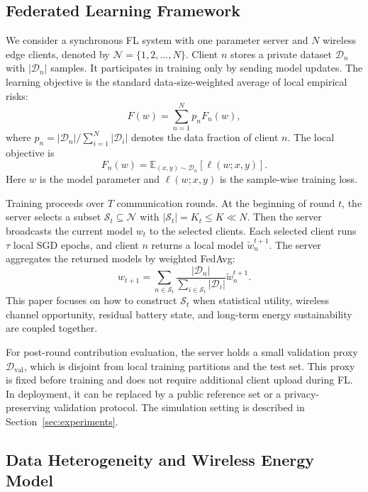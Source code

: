 \documentclass[journal]{IEEEtran}
\begin{document}
\subsection{Federated Learning Framework}

We consider a synchronous FL system with one parameter server and $N$ wireless edge clients, denoted by $\mathcal{N}=\{1,2,\ldots,N\}$. Client $n$ stores a private dataset $\mathcal{D}_n$ with $|\mathcal{D}_n|$ samples. It participates in training only by sending model updates. The learning objective is the standard data-size-weighted average of local empirical risks:
\begin{equation}
F(w)=\sum_{n=1}^{N}p_nF_n(w),
\end{equation}
where $p_n=|\mathcal{D}_n|/\sum_{i=1}^{N}|\mathcal{D}_i|$ denotes the data fraction of client $n$. The local objective is
\begin{equation}
F_n(w)=\mathbb{E}_{(x,y)\sim\mathcal{D}_n}[\ell(w;x,y)].
\end{equation}
Here $w$ is the model parameter and $\ell(w;x,y)$ is the sample-wise training loss.

Training proceeds over $T$ communication rounds. At the beginning of round $t$, the server selects a subset $\mathcal{S}_t\subseteq\mathcal{N}$ with $|\mathcal{S}_t|=K_t\leq K\ll N$. Then the server broadcasts the current model $w_t$ to the selected clients. Each selected client runs $\tau$ local SGD epochs, and client $n$ returns a local model $\tilde{w}_n^{t+1}$. The server aggregates the returned models by weighted FedAvg:
\begin{equation}
w_{t+1}=\sum_{n\in\mathcal{S}_t}
\frac{|\mathcal{D}_n|}{\sum_{i\in\mathcal{S}_t}|\mathcal{D}_i|}
\tilde{w}_n^{t+1}.
\end{equation}
This paper focuses on how to construct $\mathcal{S}_t$ when statistical utility, wireless channel opportunity, residual battery state, and long-term energy sustainability are coupled together.

For post-round contribution evaluation, the server holds a small validation proxy $\mathcal{D}_{\text{val}}$, which is disjoint from local training partitions and the test set. This proxy is fixed before training and does not require additional client upload during FL. In deployment, it can be replaced by a public reference set or a privacy-preserving validation protocol. The simulation setting is described in Section~\ref{sec:experiments}.

\subsection{Data Heterogeneity and Wireless Energy Model}
\end{document}
